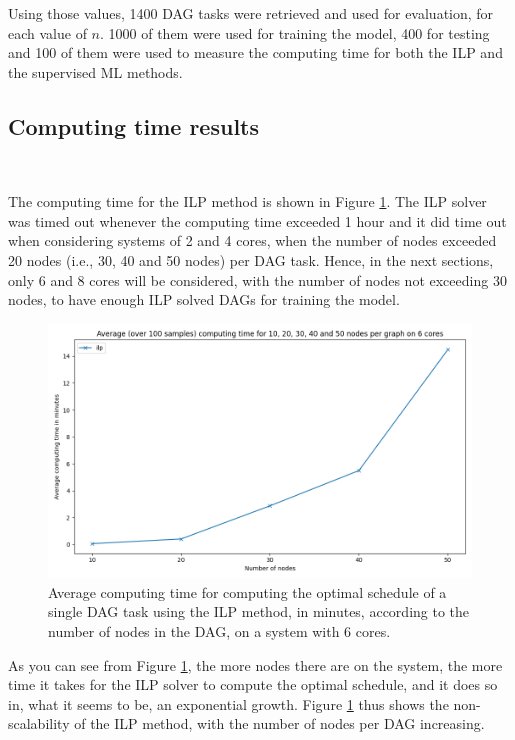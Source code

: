Using those values, 1400 DAG tasks were retrieved and used for 
evaluation, for each value of $n$.
1000 of them were used for training the model, 400 for testing
and 100 of them were used to measure the computing time 
for both the ILP and the supervised ML methods.


\subsection{Computing time results}
~

The computing time for the ILP method is shown 
in Figure \ref{fig:ilp_compute_time}.
The ILP solver was timed out whenever the computing time exceeded 1 hour
and it did time out when considering systems of 2 and 4 cores, when the number of nodes
exceeded 20 nodes (i.e., 30, 40 and 50 nodes) per DAG task.
Hence, in the next sections, only 6 and 8 cores will be considered,
with the number of nodes not exceeding 30 nodes, to have enough
ILP solved DAGs for training the model. 

\begin{figure}
    \centering
    \includegraphics[width=\linewidth]{images/result_computing_time_ilp_m6.png}
    \caption{Average computing time for computing the optimal schedule
    of a single DAG task using the ILP method, in minutes, according to 
    the number of nodes in the DAG, on a system with 6 cores.}
    \label{fig:ilp_compute_time}
\end{figure}

As you can see from Figure \ref{fig:ilp_compute_time}, the more nodes there are on the system, 
the more time it takes for the ILP solver to compute the optimal schedule,
and it does so in, what it seems to be, an exponential growth.
Figure \ref{fig:ilp_compute_time} thus shows the non-scalability
of the ILP method, with the number of nodes per DAG increasing.

